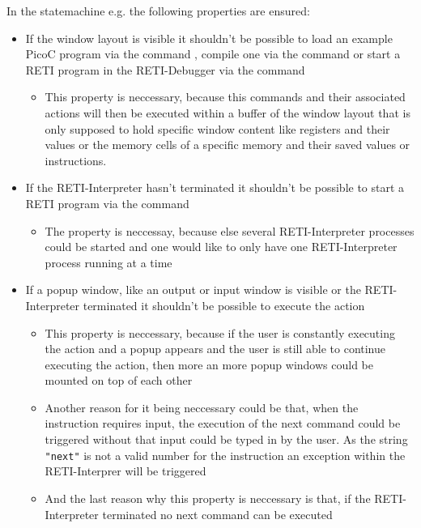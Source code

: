\documentclass{report}
\begin{document}
In the statemachine e.g. the following properties are ensured:
\begin{itemize}
  \item If the window \alert{layout} is \alert{visible} it shouldn't be possible to load an example PicoC program via the command , compile one via the command  or start a RETI program in the RETI-Debugger via the command 
  \begin{itemize}
    \item This property is neccessary, because this commands and their associated actions will then be executed within a buffer of the window layout that is only supposed to hold specific window content like registers and their values or the memory cells of a specific memory and their saved values or instructions.
  \end{itemize}
  \item If the RETI-\alert{Interpreter hasn't terminated} it shouldn't be possible to start a RETI program via the command 
  \begin{itemize}
    \item The property is neccessay, because else several RETI-Interpreter processes could be started and one would like to only have one RETI-Interpreter process running at a time
  \end{itemize}
  \item If a \alert{popup} window, like an output or input window is \alert{visible} or the RETI-\alert{Interpreter terminated} it shouldn't be possible to execute the  action
    \begin{itemize}
      \item This property is neccessary, because if the user is constantly executing the  action and a popup appears and the user is still able to continue executing the  action, then more an more popup windows could be mounted on top of each other
      \item Another reason for it being neccessary could be that, when the  instruction requires input, the execution of the next command could be triggered without that input could be typed in by the user. As the string \texttt{"next"} is not a valid number for the  instruction an exception within the RETI-Interprer will be triggered
      \item And the last reason why this property is neccessary is that, if the RETI-Interpreter terminated no next command can be executed
    \end{itemize}
\end{itemize}
\end{document}
